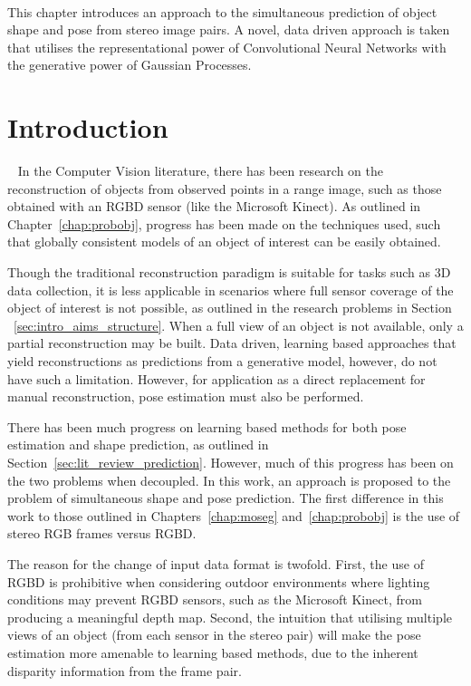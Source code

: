 ~\label{chap:spp}
\begin{chapterabstract}
This chapter introduces an approach to the simultaneous prediction of object shape 
and pose from stereo image pairs. A novel, data driven approach is taken that utilises 
the representational power of Convolutional Neural Networks with the generative power of 
Gaussian Processes.
\end{chapterabstract}

\section{Introduction}
~\label{sec:spp_introduction}
In the Computer Vision literature, there has been research on the reconstruction of objects
from observed points in a range image, such as those obtained with an RGBD sensor (like 
the Microsoft Kinect). As outlined in Chapter~\ref{chap:probobj}, progress has been made 
on the techniques used, such that globally consistent models of an object of interest can be 
easily obtained.

Though the traditional reconstruction paradigm is suitable for tasks such as 3D data 
collection, it is less applicable in scenarios where full sensor coverage of the object 
of interest is not possible, as outlined in the research problems in Section
~\ref{sec:intro_aims_structure}. When a full view of an object is not available, only a 
partial reconstruction may be built. Data driven, learning based approaches that yield 
reconstructions as predictions from a generative model, however, do not have such a limitation. 
However, for application as a direct replacement for manual reconstruction, pose estimation 
must also be performed.

There has been much progress on learning based methods for both pose estimation and 
shape prediction, as outlined in Section~\ref{sec:lit_review_prediction}. However, much of 
this progress has been on the two problems when decoupled. In this work, an approach is 
proposed to the problem of simultaneous shape and pose prediction. The first 
difference in this work to those outlined in Chapters~\ref{chap:moseg} and~\ref{chap:probobj} 
is the use of stereo RGB frames versus RGBD\@.

The reason for the change of input data format is twofold. First, the use of RGBD is prohibitive 
when considering outdoor environments where lighting conditions may prevent RGBD sensors, such as the 
Microsoft Kinect, from producing a meaningful depth map. Second, the intuition that utilising multiple 
views of an object (from each sensor in the stereo pair) will make the pose estimation more amenable to 
learning based methods, due to the inherent disparity information from the frame pair.

